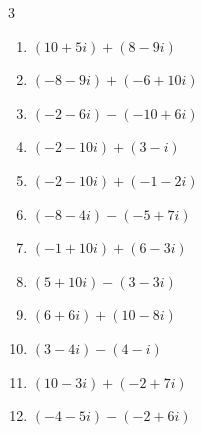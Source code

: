 \begin{multicols}{3}
\begin{enumerate}
        \phantom{$\displaystyle =-7+18i$}

  \item $\displaystyle (10+5i) + (8-9i)$

        \phantom{$\displaystyle =18-4i$}

  \item $\displaystyle (-8-9i) + (-6+10i)$

        \phantom{$\displaystyle =-14+i$}

  \item $\displaystyle (-2-6i) - (-10+6i)$

        \phantom{$\displaystyle =8-12i$}

  \item $\displaystyle (-2-10i) + (3-i)$

        \phantom{$\displaystyle =1-11i$}

  \item $\displaystyle (-2-10i) + (-1-2i)$

        \phantom{$\displaystyle =-3-12i$}

  \item $\displaystyle (-8-4i) - (-5+7i)$

        \phantom{$\displaystyle =-3-11i$}

\columnbreak %

  \item $\displaystyle (-1+10i) + (6-3i)$

        \phantom{$\displaystyle =5+7i$}

  \item $\displaystyle (5+10i) - (3-3i)$

        \phantom{$\displaystyle =2+13i$}

  \item $\displaystyle (6+6i) + (10-8i)$

        \phantom{$\displaystyle =16-2i$}

  \item $\displaystyle (3-4i) - (4-i)$

        \phantom{$\displaystyle =-1-3i$}

  \item $\displaystyle (10-3i) + (-2+7i)$

        \phantom{$\displaystyle =8+4i$}

  \item $\displaystyle (-4-5i) - (-2+6i)$

        \phantom{$\displaystyle =-2-11i$}


\end{enumerate}
\end{multicols}
